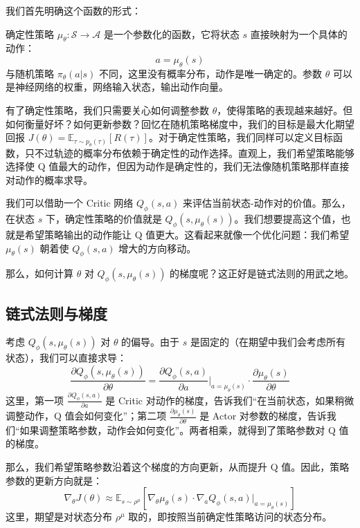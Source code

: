 \documentclass[lang=cn,zihao=-4,a4paper,fontset=windows]{beautybook}
\renewcommand{\partial}{∂}
\begin{document}
我们首先明确这个函数的形式：

\begin{definition}[][确定性策略]
确定性策略 \(\mu_\theta: \mathcal{S} \to \mathcal{A}\) 是一个参数化的函数，它将状态 \(s\) 直接映射为一个具体的动作：
\[
a = \mu_\theta(s)
\]
与随机策略 \(\pi_\theta(a|s)\) 不同，这里没有概率分布，动作是唯一确定的。参数 \(\theta\) 可以是神经网络的权重，网络输入状态，输出动作向量。
\end{definition}

有了确定性策略，我们只需要关心如何调整参数 \(\theta\)，使得策略的表现越来越好。但如何衡量好坏？如何更新参数？回忆在随机策略梯度中，我们的目标是最大化期望回报 \(J(\theta) = \mathbb{E}_{\tau \sim p_\theta(\tau)}[R(\tau)]\)。对于确定性策略，我们同样可以定义目标函数，只不过轨迹的概率分布依赖于确定性的动作选择。直观上，我们希望策略能够选择使 Q 值最大的动作，但因为动作是确定性的，我们无法像随机策略那样直接对动作的概率求导。

我们可以借助一个 Critic 网络 \(Q_\phi(s,a)\) 来评估当前状态-动作对的价值。那么，在状态 \(s\) 下，确定性策略的价值就是 \(Q_\phi(s, \mu_\theta(s))\)。我们想要提高这个值，也就是希望策略输出的动作能让 Q 值更大。这看起来就像一个优化问题：我们希望 \(\mu_\theta(s)\) 朝着使 \(Q_\phi(s,a)\) 增大的方向移动。

那么，如何计算 \(\theta\) 对 \(Q_\phi(s, \mu_\theta(s))\) 的梯度呢？这正好是链式法则的用武之地。

\subsection{链式法则与梯度}

考虑 \(Q_\phi(s, \mu_\theta(s))\) 对 \(\theta\) 的偏导。由于 \(s\) 是固定的（在期望中我们会考虑所有状态），我们可以直接求导：
\[
\frac{\partial Q_\phi(s, \mu_\theta(s))}{\partial \theta} = \frac{\partial Q_\phi(s, a)}{\partial a} \Big|_{a=\mu_\theta(s)} \cdot \frac{\partial \mu_\theta(s)}{\partial \theta}
\]
这里，第一项 \(\frac{\partial Q_\phi(s, a)}{\partial a}\) 是 Critic 对动作的梯度，告诉我们“在当前状态，如果稍微调整动作，Q 值会如何变化”；第二项 \(\frac{\partial \mu_\theta(s)}{\partial \theta}\) 是 Actor 对参数的梯度，告诉我们“如果调整策略参数，动作会如何变化”。两者相乘，就得到了策略参数对 Q 值的梯度。

那么，我们希望策略参数沿着这个梯度的方向更新，从而提升 Q 值。因此，策略参数的更新方向就是：
\[
\nabla_\theta J(\theta) \approx \mathbb{E}_{s \sim \rho^\mu} \left[ \nabla_\theta \mu_\theta(s) \cdot \nabla_a Q_\phi(s, a) \big|_{a=\mu_\theta(s)} \right]
\]
这里，期望是对状态分布 \(\rho^\mu\) 取的，即按照当前确定性策略访问的状态分布。
\end{document}
